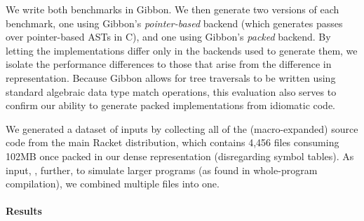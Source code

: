 \documentclass[a4paper,english]{lipics-v2016}
\newcommand{\treelang}{Gibbon\xspace} %
\begin{document}
We write both benchmarks in \treelang{}. We then generate two versions of each
benchmark, one using \treelang{}'s {\em pointer-based} backend (which
generates passes over pointer-based ASTs in C), and one using \treelang{}'s
{\em packed} backend. By letting the
implementations differ only in the backends used to generate them, we isolate
the performance differences to those that arise from the difference in
representation. Because \treelang{} allows for tree traversals to be written
using standard algebraic data type match operations, this evaluation also
serves to confirm our ability to generate packed implementations from
idiomatic code.

We generated a dataset of inputs by collecting all of the (macro-expanded) source
code from the main Racket distribution, which contains 4,456 files consuming
102MB once packed in our dense representation (disregarding symbol tables).
%
As input, ,
%
further, to simulate larger programs (as found in whole-program compilation), we combined
multiple files into one.
%
%

\paragraph*{Results}

\end{document}
